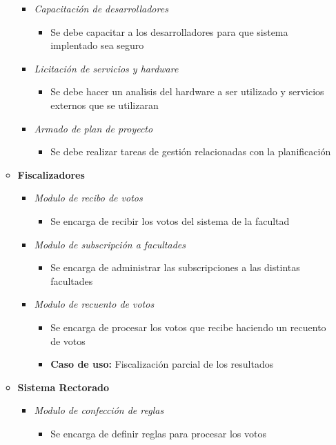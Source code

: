 \begin{itemize}
\begin{itemize}
\begin{itemize}
 \item \emph{Capacitación de desarrolladores}
\begin{itemize}
 \item Se debe capacitar a los desarrolladores para que sistema implentado sea seguro
\end{itemize}
 \item \emph{Licitación de servicios y hardware}
\begin{itemize}
 \item Se debe hacer un analisis del hardware a ser utilizado y servicios externos que se utilizaran
\end{itemize}
 \item \emph{Armado de plan de proyecto}
\begin{itemize}
 \item Se debe realizar tareas de gestión relacionadas con la planificación
\end{itemize}
\end{itemize}
 \item {\bf Fiscalizadores}
\begin{itemize}
 \item \emph{Modulo de recibo de votos}
\begin{itemize}
 \item Se encarga de recibir los votos del sistema de la facultad
\end{itemize}
 \item \emph{Modulo de subscripción a facultades}
\begin{itemize}
 \item Se encarga de administrar las subscripciones a las distintas facultades
\end{itemize}
 \item \emph{Modulo de recuento de votos}
\begin{itemize}
 \item Se encarga de procesar los votos que recibe haciendo un recuento de votos
 \item {\bf Caso de uso:} Fiscalización parcial de los resultados
\end{itemize}
\end{itemize}
 \item {\bf Sistema Rectorado}
\begin{itemize}
 \item \emph{Modulo de confección de reglas}
\begin{itemize}
 \item Se encarga de definir reglas para procesar los votos

\end{itemize}
\end{itemize}
\end{itemize}
\end{itemize}
